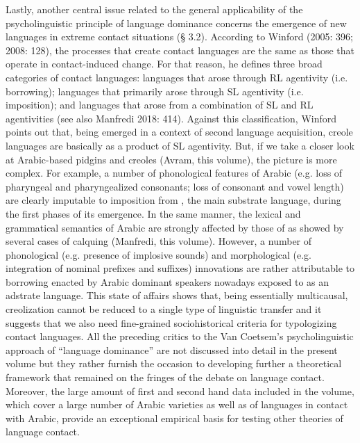 \documentclass[output=paper]{langsci/langscibook}
\begin{document}
Lastly, another central issue related to the general applicability of the psycholinguistic principle of language dominance concerns the emergence of new languages in extreme contact situations (§ 3.2). According to Winford (2005: 396; 2008: 128), the processes that create contact languages are the same as those that operate in contact-induced change. For that reason, he defines three broad categories of contact languages: languages that arose through RL agentivity (i.e. borrowing); languages that primarily arose through SL agentivity (i.e. imposition); and languages that arose from a combination of SL and RL agentivities (see also Manfredi 2018: 414). Against this classification, Winford points out that, being emerged in a context of second language acquisition, creole languages are basically as a product of SL agentivity. But, if we take a closer look at Arabic-based pidgins and creoles (Avram, this volume), the picture is more complex. For example, a number of phonological features of  Arabic (e.g. loss of pharyngeal and pharyngealized consonants; loss of consonant and vowel length) are clearly imputable to imposition from , the main substrate language, during the first phases of its emergence. In the same manner, the lexical and grammatical semantics of  Arabic are strongly affected by those of  as showed by several cases of calquing (Manfredi, this volume). However, a number of phonological (e.g. presence of implosive sounds) and morphological (e.g. integration of nominal prefixes and suffixes) innovations are rather attributable to borrowing enacted by  Arabic dominant speakers nowadays exposed to  as an adstrate language. This state of affairs shows that, being essentially multicausal, creolization cannot be reduced to a single type of linguistic transfer and it suggests that we also need fine-grained sociohistorical criteria for typologizing contact languages.  
All the preceding critics to the Van Coetsem’s psycholinguistic approach of “language dominance” are not discussed into detail in the present volume but they rather furnish the occasion to developing further a theoretical framework that remained on the fringes of the debate on language contact. Moreover, the large amount of first and second hand data included in the volume, which cover a large number of Arabic varieties as well as of languages in contact with Arabic, provide an exceptional empirical basis for testing other theories of language contact.
\end{document}
